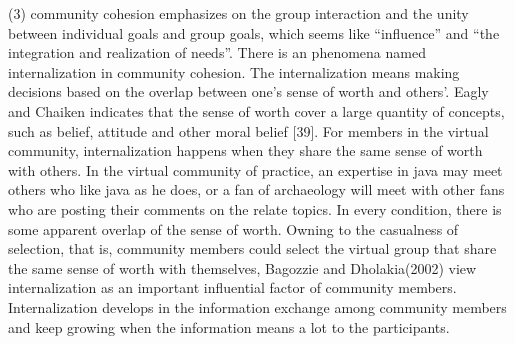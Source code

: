 \documentclass{elsarticle}
\begin{document}
(3)  community cohesion emphasizes on the group interaction and the
unity between individual goals and group goals, which seems like
“influence” and “the integration and realization of needs”. There is
an phenomena named internalization in community cohesion. The
internalization means making decisions based on the overlap between
one’s sense of worth and others’. Eagly and Chaiken indicates that the
sense of worth cover a large quantity of concepts, such as belief,
attitude and other moral belief [39]. For members in the virtual
community, internalization happens when they share the same sense of
worth with others. In the virtual community of practice, an expertise
in java may meet others who like java as he does, or a fan of
archaeology will meet with other fans who are posting their comments
on the relate topics. In every condition, there is some apparent
overlap of the sense of worth. Owning to the casualness of selection,
that is, community members could select the virtual group that share
the same sense of worth with themselves, Bagozzie and Dholakia(2002)
view internalization as an important influential factor of community
members. Internalization develops in the information exchange among
community members and keep growing when the information means a lot to
the participants. 
\end{document}
